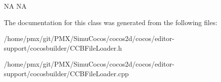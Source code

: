 NA  NA 

The documentation for this class was generated from the following files\+:\begin{DoxyCompactItemize}
\item 
/home/pmx/git/\+P\+M\+X/\+Simu\+Cocos/cocos2d/cocos/editor-\/support/cocosbuilder/C\+C\+B\+File\+Loader.\+h\item 
/home/pmx/git/\+P\+M\+X/\+Simu\+Cocos/cocos2d/cocos/editor-\/support/cocosbuilder/C\+C\+B\+File\+Loader.\+cpp\end{DoxyCompactItemize}
